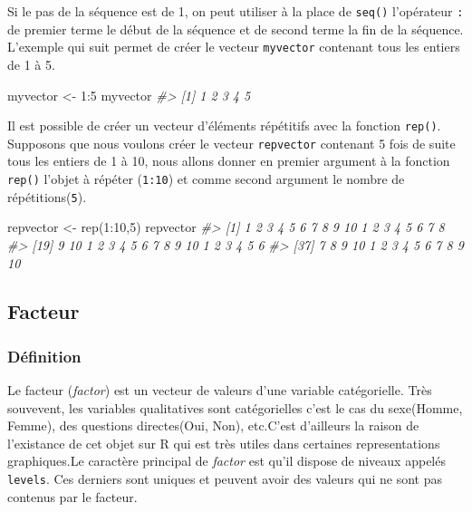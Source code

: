 \documentclass[
]{book}
\newenvironment{Shaded}{\begin{snugshade}}{\end{snugshade}}
\newcommand{\CommentTok}[1]{\textcolor[rgb]{0.56,0.35,0.01}{\textit{#1}}}
\newcommand{\DecValTok}[1]{\textcolor[rgb]{0.00,0.00,0.81}{#1}}
\newcommand{\FunctionTok}[1]{\textcolor[rgb]{0.00,0.00,0.00}{#1}}
\newcommand{\NormalTok}[1]{#1}
\newcommand{\OtherTok}[1]{\textcolor[rgb]{0.56,0.35,0.01}{#1}}
\newcommand{\SpecialCharTok}[1]{\textcolor[rgb]{0.00,0.00,0.00}{#1}}
\begin{document}
Si le pas de la séquence est de 1, on peut utiliser à la place de \texttt{seq()} l'opérateur \texttt{:} de premier terme le début de la séquence et de second terme la fin de la séquence. L'exemple qui suit permet de créer le vecteur \texttt{myvector} contenant tous les entiers de 1 à 5.

\begin{Shaded}
\begin{Highlighting}[]
\NormalTok{myvector }\OtherTok{\textless{}{-}} \DecValTok{1}\SpecialCharTok{:}\DecValTok{5}
\NormalTok{myvector}
\CommentTok{\#\textgreater{} [1] 1 2 3 4 5}
\end{Highlighting}
\end{Shaded}

Il est possible de créer un vecteur d'éléments répétitifs avec la fonction \texttt{rep()}. Supposons que nous voulons créer le vecteur \texttt{repvector} contenant 5 fois de suite tous les entiers de 1 à 10, nous allons donner en premier argument à la fonction \texttt{rep()} l'objet à répéter (\texttt{1:10}) et comme second argument le nombre de répétitions(\texttt{5}).

\begin{Shaded}
\begin{Highlighting}[]
\NormalTok{repvector }\OtherTok{\textless{}{-}} \FunctionTok{rep}\NormalTok{(}\DecValTok{1}\SpecialCharTok{:}\DecValTok{10}\NormalTok{,}\DecValTok{5}\NormalTok{)}
\NormalTok{repvector}
\CommentTok{\#\textgreater{}  [1]  1  2  3  4  5  6  7  8  9 10  1  2  3  4  5  6  7  8}
\CommentTok{\#\textgreater{} [19]  9 10  1  2  3  4  5  6  7  8  9 10  1  2  3  4  5  6}
\CommentTok{\#\textgreater{} [37]  7  8  9 10  1  2  3  4  5  6  7  8  9 10}
\end{Highlighting}
\end{Shaded}

\hypertarget{facteur}{%
\subsection{Facteur}\label{facteur}}

\hypertarget{duxe9finition-1}{%
\subsubsection*{Définition}\label{duxe9finition-1}}

Le facteur (\emph{factor}) est un vecteur de valeurs d'une variable catégorielle. Très souvevent, les variables qualitatives sont catégorielles c'est le cas du sexe(Homme, Femme), des questions directes(Oui, Non), etc.C'est d'ailleurs la raison de l'existance de cet objet sur R qui est très utiles dans certaines representations graphiques.Le caractère principal de \emph{factor} est qu'il dispose de niveaux appelés \texttt{levels}. Ces derniers sont uniques et peuvent avoir des valeurs qui ne sont pas contenus par le facteur.
\end{document}
